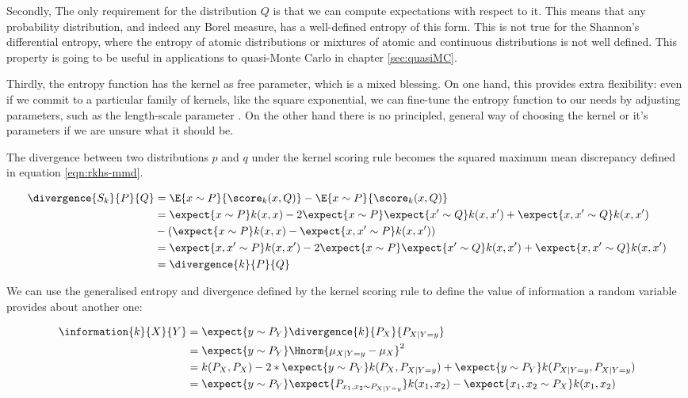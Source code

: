 Secondly, The only requirement for the distribution $Q$ is that we can compute expectations with respect to it. This means that any probability distribution, and indeed any Borel measure, has a well-defined entropy of this form. This is not true for the Shannon's differential entropy, where the entropy of atomic distributions or mixtures of atomic and continuous distributions is not well defined. This property is going to be useful in applications to quasi-Monte Carlo in chapter \ref{sec:quasiMC}.

Thirdly, the entropy function has the kernel as free parameter, which is a mixed blessing. On one hand, this provides extra flexibility: even if we commit to a particular family of kernels, like the square exponential, we can fine-tune the entropy function to our needs by adjusting parameters, such as the length-scale parameter \cite{tailoring}. On the other hand there is no principled, general way of choosing the kernel or it's parameters if we are unsure what it should be.

The divergence between two distributions $p$ and $q$ under the kernel scoring rule becomes the squared maximum mean discrepancy defined in equation \eqref{eqn:rkhs-mmd}.

\begin{align}
	\divergence{S_k}{P}{Q} &= \E{x\sim P}{\score_{k}(x,Q)} - \E{x\sim P}{\score_k(x,Q)}\\ 
		&= \expect{x\sim P} k(x,x) - 2 \expect{x\sim P}\expect{x' \sim Q} k(x,x') + \expect{x,x'\sim Q} k(x,x')\\
		&- \left( \expect{x \sim P} k(x,x) - \expect{x,x'\sim P} k(x,x') \right)\\
		&=  \expect{x,x'\sim P} k(x,x')	- 2 \expect{x\sim P}\expect{x'\sim Q} k(x,x') + \expect{x,x'\sim Q} k(x,x')\\
		&= \divergence{k}{P}{Q}
\end{align}

We can use the generalised entropy and divergence defined by the kernel scoring rule to define the value of information a random variable provides about another one:

\begin{align}
	\information{k}{X}{Y} &= \expect{y\sim P_{Y}} \divergence{k}{P_{X}}{P_{X\vert Y=y}}\\
		&=  \expect{y\sim P_{Y}} \Hnorm{ \mu_{X \vert Y=y} - \mu_X }^2 \label{eqn:kernel_information}\\
		&= k(P_{X},P_{X}) - 2*\expect{y\sim P_{Y}}k(P_{X},P_{X\vert Y=y}) + \expect{y\sim P_{Y}} k(P_{X\vert Y=y},P_{X\vert Y=y})\\
		&= \expect{y\sim P_{Y}} \expect{P_{x_1,x_2 \sim P_{X\vert Y=y}}}k(x_1,x_2) - \expect{x_1,x_2\sim P_{X}}k(x_1,x_2)
\end{align}

